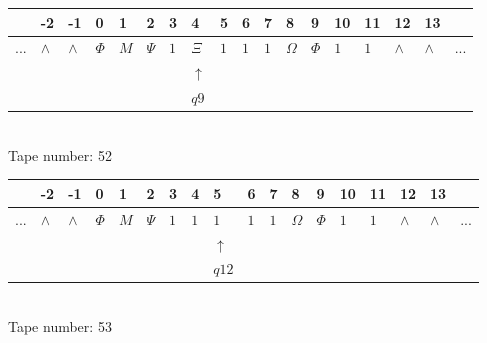 \documentclass[11pt]{article}
\begin{document}
\begin{table}[H]
\centering
\begin{tabular}{llllllllllllllllll}
 & -2 & -1 & 0 & 1 & 2 & 3 & 4 & 5 & 6 & 7 & 8 & 9 & 10 & 11 & 12 & 13 & \\
\hline
$...$ & \multicolumn{1}{|l|}{$\wedge$} & \multicolumn{1}{|l|}{$\wedge$} & \multicolumn{1}{|l|}{$\Phi$} & \multicolumn{1}{|l|}{$M$} & \multicolumn{1}{|l|}{$\Psi$} & \multicolumn{1}{|l|}{$1$} & \multicolumn{1}{|l|}{$\Xi$} & \multicolumn{1}{|l|}{$1$} & \multicolumn{1}{|l|}{$1$} & \multicolumn{1}{|l|}{$1$} & \multicolumn{1}{|l|}{$\Omega$} & \multicolumn{1}{|l|}{$\Phi$} & \multicolumn{1}{|l|}{$1$} & \multicolumn{1}{|l|}{$1$} & \multicolumn{1}{|l|}{$\wedge$} & \multicolumn{1}{|l|}{$\wedge$} & $...$\\
\hline
&  &  &  &  &  &  & $\uparrow$ &  &  &  &  &  &  &  &  &  &  \\
&  &  &  &  &  &  & $ q9 $ &  &  &  &  &  &  &  &  &  &  \\
\end{tabular}
\\
Tape number: 52
\noindent\makebox[\linewidth]{\hdashrule{\textwidth}{1pt}{1pt}}\end{table}

\begin{table}[H]
\centering
\begin{tabular}{llllllllllllllllll}
 & -2 & -1 & 0 & 1 & 2 & 3 & 4 & 5 & 6 & 7 & 8 & 9 & 10 & 11 & 12 & 13 & \\
\hline
$...$ & \multicolumn{1}{|l|}{$\wedge$} & \multicolumn{1}{|l|}{$\wedge$} & \multicolumn{1}{|l|}{$\Phi$} & \multicolumn{1}{|l|}{$M$} & \multicolumn{1}{|l|}{$\Psi$} & \multicolumn{1}{|l|}{$1$} & \multicolumn{1}{|l|}{$1$} & \multicolumn{1}{|l|}{$1$} & \multicolumn{1}{|l|}{$1$} & \multicolumn{1}{|l|}{$1$} & \multicolumn{1}{|l|}{$\Omega$} & \multicolumn{1}{|l|}{$\Phi$} & \multicolumn{1}{|l|}{$1$} & \multicolumn{1}{|l|}{$1$} & \multicolumn{1}{|l|}{$\wedge$} & \multicolumn{1}{|l|}{$\wedge$} & $...$\\
\hline
&  &  &  &  &  &  &  & $\uparrow$ &  &  &  &  &  &  &  &  &  \\
&  &  &  &  &  &  &  & $ q12 $ &  &  &  &  &  &  &  &  &  \\
\end{tabular}
\\
Tape number: 53
\noindent\makebox[\linewidth]{\hdashrule{\textwidth}{1pt}{1pt}}\end{table}
\clearpage
\end{document}
